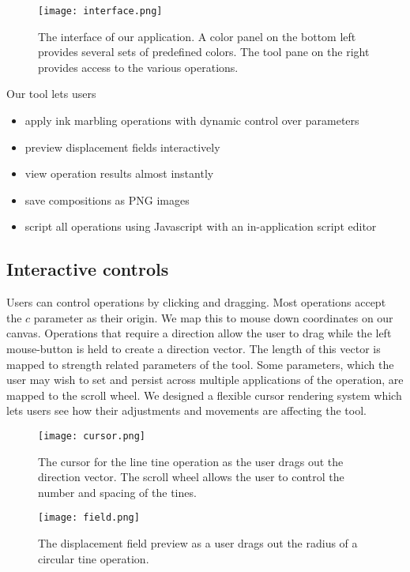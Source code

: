 \documentclass{article}
\begin{document}
\begin{figure}
    \texttt{[image: interface.png]}
    \caption{The interface of our application. A color panel on the bottom left provides several sets of predefined colors. The tool pane on the right provides access to the various operations.}
\end{figure}

Our tool lets users

\begin{itemize}
    \item apply ink marbling operations with dynamic control over parameters
    \item preview displacement fields interactively
    \item view operation results almost instantly
    \item save compositions as PNG images
    \item script all operations using Javascript with an in-application script editor
\end{itemize}

\subsection{Interactive controls}

Users can control operations by clicking and dragging. Most operations accept the $c$ parameter as their origin. We map this to mouse down coordinates on our canvas. Operations that require a direction allow the user to drag while the left mouse-button is held to create a direction vector. The length of this vector is mapped to strength related parameters of the tool. Some parameters, which the user may wish to set and persist across multiple applications of the operation, are mapped to the scroll wheel. We designed a flexible cursor rendering system which lets users see how their adjustments and movements are affecting the tool.

\begin{figure}
    \texttt{[image: cursor.png]}
    \caption{The cursor for the line tine operation as the user drags out the direction vector. The scroll wheel allows the user to control the number and spacing of the tines.}
\end{figure}

\begin{figure}
    \texttt{[image: field.png]}
    \caption{The displacement field preview as a user drags out the radius of a circular tine operation.}
\end{figure}
\end{document}
